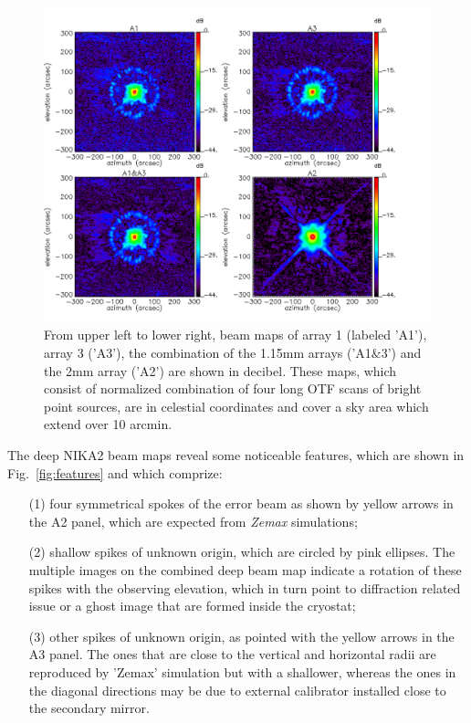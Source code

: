 \begin{figure}[ht!]
\begin{center}
  \includegraphics[clip, angle=0, scale=0.4]{Figures/Lobe_map_Combo_v2_dB.pdf}
 \caption[Beam pattern.]{From upper left to lower right, beam maps of array 1 (labeled 'A1'), array 3 ('A3'), the combination of the 1.15mm arrays ('A1$\&$3') and the 2mm array ('A2') are shown in decibel. These maps, which consist of normalized combination of four long OTF scans of bright point sources, are in celestial coordinates and cover a sky area which extend over 10 arcmin.}
\label{fig:beam}
\end{center}
\end{figure}

The deep NIKA2 beam maps reveal some noticeable features, which are
shown in Fig.~\ref{fig:features} and which comprize:
\begin{itemize}
\item[(1)] four symmetrical spokes of the error beam as shown by
  yellow arrows in the A2 panel, which are expected from \emph{Zemax}
  simulations;
\item[(2)] shallow spikes of unknown origin, which are circled by pink
  ellipses. The multiple images on the combined deep beam map indicate
  a rotation of these spikes with the observing elevation, which in
  turn point to diffraction related issue or a ghost image that are
  formed inside the cryostat;
\item[(3)] other spikes of unknown origin, as pointed with the yellow
  arrows in the A3 panel. The ones that are close to the vertical and
  horizontal radii are reproduced by 'Zemax' simulation but with a  
  shallower, whereas the ones in the diagonal directions may be due to
  external calibrator installed close to the secondary mirror.  
\end{itemize}

